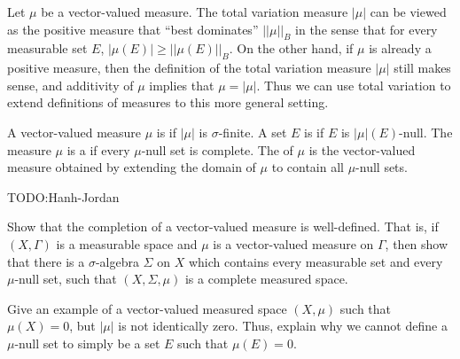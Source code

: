 \begin{subsec}
Let $\mu$ be a vector-valued measure.
The total variation measure $|\mu|$ can be viewed as the positive measure that ``best dominates'' $||\mu||_{B}$ in the sense that for every measurable set $E$, $|\mu(E)| \geq ||\mu(E)||_{B}$.
On the other hand, if $\mu$ is already a positive measure, then the definition of the total variation measure $|\mu|$ still makes sense, and additivity of $\mu$ implies that $\mu = |\mu|$.
Thus we can use total variation to extend definitions of measures to this more general setting.
\end{subsec}

\begin{definition}
A vector-valued measure $\mu$ is  if $|\mu|$ is $\sigma$-finite.
A set $E$ is  if $E$ is $|\mu|(E)$-null.
The measure $\mu$ is a  if every $\mu$-null set is complete.
The  of $\mu$ is the vector-valued measure obtained by extending the domain of $\mu$ to contain all $\mu$-null sets.
\end{definition}

TODO:Hanh-Jordan

\begin{exercise}
Show that the completion of a vector-valued measure is well-defined.
That is, if $(X, \Gamma)$ is a measurable space and $\mu$ is a vector-valued measure on $\Gamma$, then show that there is a $\sigma$-algebra $\Sigma$ on $X$ which contains every measurable set and every $\mu$-null set, such that $(X, \Sigma, \mu)$ is a complete measured space.
\end{exercise}

\begin{exercise}
Give an example of a vector-valued measured space $(X, \mu)$ such that $\mu(X) = 0$, but $|\mu|$ is not identically zero.
Thus, explain why we cannot define a $\mu$-null set to simply be a set $E$ such that $\mu(E) = 0$.
\end{exercise}
